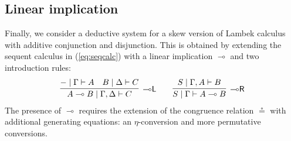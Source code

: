 \documentclass[submission,copyright,creativecommons]{eptcs}
\theoremstyle{definition}
\newcommand{\lright}{{\multimap}\mathsf{R}}
\newcommand{\lleft}{{\multimap}\mathsf{L}}
\newcommand{\lolli}{\multimap}
\newcommand{\SkNMILLA}{$\mathtt{SkNMILLA}$}
\begin{document}
\subsection{Linear implication}\label{subsec:impl}
Finally, we consider a deductive system for a skew version of Lambek calculus with additive conjunction and disjunction.
This is obtained by extending the sequent calculus in (\ref{eq:seqcalc}) with a linear implication $\lolli$ and two introduction rules:
\begin{displaymath}
  \begin{array}{c}
    \infer[\lleft]{A \lolli B \mid \Gamma , \Delta \vdash C}{
      - \mid \Gamma \vdash A
      &
      B \mid \Delta \vdash C
    }
    \qquad
    \infer[\lright]{S \mid \Gamma \vdash A \lolli B}{S \mid \Gamma , A \vdash B}
  \end{array}
\end{displaymath}
The presence of $\lolli$ requires the extension of the congruence relation $\circeq$ with additional generating equations: an $\eta$-conversion and more permutative conversions.
\end{document}
